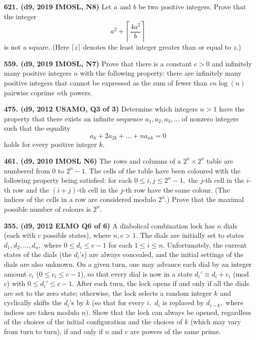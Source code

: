 \documentclass{article}
\begin{document}
\textbf{621. (\color{red}d9\color{black}, 2019 IMOSL, N8)} Let $a$ and $b$ be two positive integers. Prove that the integer
\[a^2+\left\lceil\frac{4a^2}b\right\rceil\]is not a square. (Here $\lceil z\rceil$ denotes the least integer greater than or equal to $z$.)

\textbf{559. (\color{red}d9\color{black}, 2019 IMOSL, N7)} Prove that there is a constant $c>0$ and infinitely many positive integers $n$ with the following property: there are infinitely many positive integers that cannot be expressed as the sum of fewer than $cn\log(n)$ pairwise coprime $n$th powers.

\textbf{475. (\color{red}d9\color{black}, 2012 USAMO, Q3 of 3)} Determine which integers $n > 1$ have the property that there exists an infinite sequence $a_1, a_2, a_3, \ldots$ of nonzero integers such that the equality\[a_k+2a_{2k}+\ldots+na_{nk}=0\]holds for every positive integer $k$.

\textbf{461. (\color{red}d9\color{black}, 2010 IMOSL N6)} The rows and columns of a $2^n \times 2^n$ table are numbered from $0$ to $2^{n}-1.$ The cells of the table have been coloured with the following property being satisfied: for each $0 \leq i,j \leq 2^n - 1,$ the $j$-th cell in the $i$-th row and the $(i+j)$-th cell in the $j$-th row have the same colour. (The indices of the cells in a row are considered modulo $2^n$.) Prove that the maximal possible number of colours is $2^n$.

\textbf{355. (\color{red}d9\color{black}, 2012 ELMO Q6 of 6)} A diabolical combination lock has $n$ dials (each with $c$ possible states), where $n, c > 1.$ The dials are initially set to states $d_1, d_2, \dots, d_n,$ where $0 \leq d_i \leq c - 1$ for each $1 \leq i \leq n.$ Unfortunately, the current states of the dials (the $d_i$'s) are always concealed, and the initial settings of the dials are also unknown. On a given turn, one may advance each dial by an integer amount $c_i$ ($0 \leq c_i \leq c - 1$), so that every dial is now in a state $d_i ' \equiv d_i + c_i$ (mod $c$) with $0 \leq d_i ' \leq c - 1.$ After each turn, the lock opens if and only if all the dials are set to the zero state; otherwise, the lock selects a random integer $k$ and cyclically shifts the $d_i$'s by $k$ (so that for every $i,$ $d_i$ is replaced by $d_{i - k},$ where indices are taken modulo $n).$
\smallbreak
Show that the lock can always be opened, regardless of the choices of the initial configuration and the choices of $k$ (which may vary from turn to turn), if and only if $n$ and $c$ are powers of the same prime.
\end{document}
